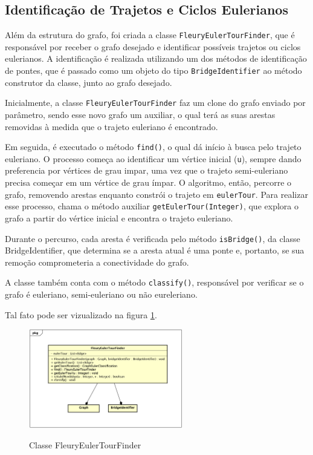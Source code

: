 \subsection{\esp Identificação de Trajetos e Ciclos Eulerianos}

Além da estrutura do grafo, foi criada a classe \texttt{FleuryEulerTourFinder}, que é responsável por receber o grafo desejado e identificar possíveis trajetos ou ciclos eulerianos. A identificação é realizada utilizando um dos métodos de identificação de pontes, que é passado como um objeto do tipo \texttt{BridgeIdentifier} ao método construtor da classe, junto ao grafo desejado.

Inicialmente, a classe \texttt{FleuryEulerTourFinder} faz um clone do grafo enviado por parâmetro, sendo esse novo grafo um auxiliar, o qual terá as suas arestas removidas à medida que o trajeto euleriano é encontrado.

Em seguida, é executado o método \texttt{find()}, o qual dá início à busca pelo trajeto euleriano. O processo começa ao identificar um vértice inicial (\texttt{u}), sempre dando preferencia por vértices de grau impar, uma vez que o trajeto semi-euleriano precisa começar em um vértice de grau ímpar. O algoritmo, então, percorre o grafo, removendo arestas enquanto constrói o trajeto em \texttt{eulerTour}. Para realizar esse processo, chama o método auxiliar \texttt{getEulerTour(Integer)}, que explora o grafo a partir do vértice inicial e encontra o trajeto euleriano.

Durante o percurso, cada aresta é verificada pelo método \texttt{isBridge()}, da classe BridgeIdentifier, que determina se a aresta atual é uma ponte e, portanto, se sua remoção comprometeria a conectividade do grafo. 

A classe também conta com o método \texttt{classify()}, responsável por verificar se o grafo é euleriano, semi-euleriano ou não eureleriano.

 Tal fato pode ser vizualizado na figura \ref{fig:figura2}. 
\begin{figure}[ht]
	\centering	
	\caption[\hspace{0.1cm}Grafo.]{Classe FleuryEulerTourFinder}
	\vspace{-0.4cm}
	\includegraphics[width=0.6\textwidth]{figuras/fleury-euler-tour-finder-class.png}
	 \vspace{-0.2cm}
	\label{fig:figura2}
\end{figure}
\vspace{-0.5cm}


